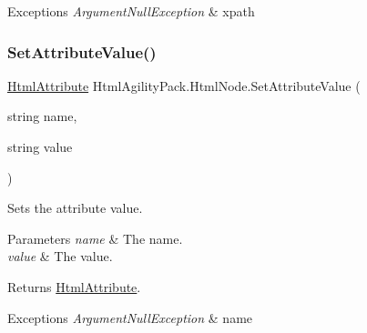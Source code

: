 \begin{DoxyExceptions}{Exceptions}
{\em Argument\+Null\+Exception} & xpath\\
\hline
\end{DoxyExceptions}
\mbox{\label{class_html_agility_pack_1_1_html_node_af889300d83126b6b6bcf99af3d5c6a89}} 
\subsubsection{\texorpdfstring{Set\+Attribute\+Value()}{SetAttributeValue()}}
{\footnotesize\ttfamily \hyperlink{class_html_agility_pack_1_1_html_attribute}{Html\+Attribute} Html\+Agility\+Pack.\+Html\+Node.\+Set\+Attribute\+Value (\begin{DoxyParamCaption}\item[{string}]{name,  }\item[{string}]{value }\end{DoxyParamCaption})\hspace{0.3cm}{\ttfamily [inline]}}



Sets the attribute value. 


\begin{DoxyParams}{Parameters}
{\em name} & The name.\\
\hline
{\em value} & The value.\\
\hline
\end{DoxyParams}
\begin{DoxyReturn}{Returns}
\hyperlink{class_html_agility_pack_1_1_html_attribute}{Html\+Attribute}.
\end{DoxyReturn}

\begin{DoxyExceptions}{Exceptions}
{\em Argument\+Null\+Exception} & name\\
\hline
\end{DoxyExceptions}
\mbox{\label{class_html_agility_pack_1_1_html_node_a9fa855e558b47c6e03aa278c4b0fa673}} 
